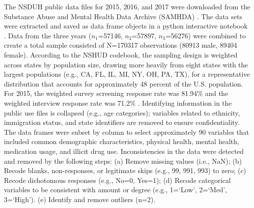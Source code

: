 \documentclass[sigconf]{acmart}
\begin{document}
The NSDUH public data files for 2015, 2016, and 2017 were downloaded from 
the Substance Abuse and Mental Health Data Archive (SAMHDA) \cite{samhsa18}. 
The data sets were extracted and saved as data frame objects in a python 
interactive notebook \cite{mckinney17, vanderplas17}. Data from the three
years ($n_1$=57146, $n_2$=57897, $n_3$=56276) were combined to create a 
total sample consisted of N=170317 observations (80913 male, 89404 female). 
According to the NSHUD codebook, the sampling design is weighted across 
states by population size, drawing more heavily from eight states with 
the largest populations (e.g., CA, FL, IL, MI, NY, OH, PA, TX), for a 
representative distribution that accounts for approximately 48 percent 
of the U.S. population. For 2015, the weighted survey screening response 
rate was 81.94\% and the weighted interview response rate was 71.2\% 
\cite{samhsa18}. Identifying information in the public use files is 
collapsed (e.g., age categories); variables related to ethnicity, immigration 
status, and state identifiers are removed to ensure confidentiality. The data 
frames were subset by column to select approximately 90 variables that 
included common demographic characteristics, physical health, mental health, 
medication usage, and illicit drug use. Inconsistencies in the data were 
detected and removed by the following steps: (a) Remove missing values 
(i.e., NaN); (b) Recode blanks, non-responses, or legitimate skips 
(e.g., 99, 991, 993) to zero; (c) Recode dichotomous responses (e.g., No=0, 
Yes=1); (d) Recode categorical variables to be consistent with amount or 
degree  (e.g., 1=`Low', 2=`Med', 3=`High'). (e) Identify and remove 
outliers (n=2).

\end{document}
